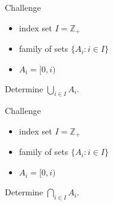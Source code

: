 \documentclass{beamer}
\begin{document}
\begin{frame}{Challenge}
\begin{itemize}
\item index set $I = \mathbb{Z}_+$
\item family of sets $\{A_i: i\in I\}$
\item $A_i = [0,i)$
\end{itemize}
\begin{prob}
Determine $\bigcup_{i\in I} A_i$.
\end{prob}
\end{frame}

\begin{frame}{Challenge}
\begin{itemize}
\item index set $I = \mathbb{Z}_+$
\item family of sets $\{A_i: i\in I\}$
\item $A_i = [0,i)$
\end{itemize}
\begin{prob}
Determine $\bigcap_{i\in I} A_i$.
\end{prob}
\end{frame}
\end{document}
